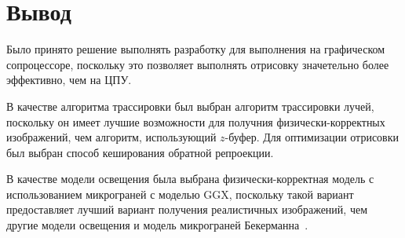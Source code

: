 \section{Вывод}

Было принято решение выполнять разработку для выполнения на графическом сопроцессоре,
поскольку это позволяет выполнять отрисовку значетельно более эффективно, чем на ЦПУ.

В качестве алгоритма трассировки был выбран алгоритм трассировки лучей, поскольку он имеет
лучшие возможности для получния физически-корректных изображений, чем 
алгоритм, использующий $z$-буфер.
Для оптимизации отрисовки был выбран способ кеширования 
обратной репроекции.

В качестве модели освещения была выбрана физически-корректная модель с использованием
микрограней с моделью GGX, поскольку такой вариант предоставляет лучший вариант
получения реалистичных изображений, чем другие модели освещения и модель микрограней Бекерманна~\cite{MMfRtRS}.

